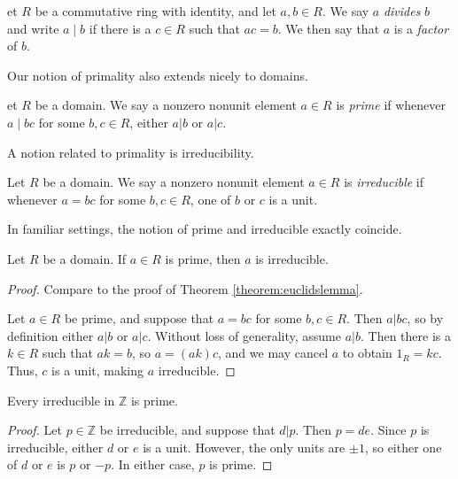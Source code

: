 \documentclass[english,course]{lecture}
\theoremstyle{plain}
\newenvironment{definition}[1]
  {\renewcommand\theinnerdefinition{#1}\innerdefinition}
  {\endinnerdefinition}
\def\Z{{\mathbb Z}}
\def\presnotes{}
\begin{document}
\begin{definition}
	Let $R$ be a commutative ring with identity, and let $a,b\in R$.
	We say $a$ \emph{divides} $b$ and write $a\mid b$ if there is a $c\in R$ such that $ac = b$.
	We then say that $a$ is a \emph{factor} of $b$.
\end{definition}









	
	
Our notion of primality also extends nicely to domains.


\begin{definition}
	Let $R$ be a domain.
	We say a nonzero nonunit element $a\in R$ is \emph{prime} if whenever $a\mid bc$ for some $b,c\in R$, either $a|b$ or $a|c$.
\end{definition}

A notion related to primality is irreducibility.


\begin{definition}\label{def:irreducibleelement}
	Let $R$ be a domain.
	We say a nonzero nonunit element $a\in R$ is \emph{irreducible} if whenever $a = bc$ for some $b,c\in R$, one of $b$ or $c$ is a unit.
\end{definition}

In familiar settings, the notion of prime and irreducible exactly coincide.

\begin{theorem}
	Let $R$ be a domain.
	If $a\in R$ is prime, then $a$ is irreducible.
\end{theorem}

\begin{proof}
	Compare to the proof of Theorem \ref{theorem:euclidslemma}.
	
	Let $a\in R$ be prime, and suppose that $a = bc$ for some $b,c\in R$.
	Then $a|bc$, so by definition either $a|b$ or $a|c$.
	Without loss of generality, assume $a|b$.
	Then there is a $k\in R$ such that $ak=b$, so $a = (ak)c$, and we may cancel $a$ to obtain $1_R = kc$.
	Thus, $c$ is a unit, making $a$ irreducible.
\end{proof}

\presnotes


\begin{theorem}
	Every irreducible in $\Z$ is prime.
\end{theorem}

\begin{proof}
	Let $p\in \Z$ be irreducible, and suppose that $d|p$.
	Then $p = de$.
	Since $p$ is irreducible, either $d$ or $e$ is a unit.
	However, the only units are $\pm 1$, so either one of $d$ or $e$ is $p$ or $-p$.
	In either case, $p$ is prime.
\end{proof}
\end{document}
